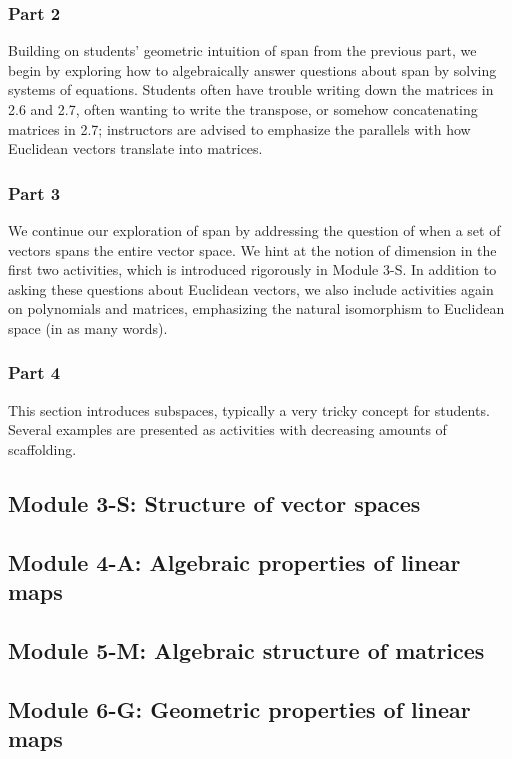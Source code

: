 \documentclass{article}
\begin{document}
\subsubsection*{Part 2}
Building on students' geometric intuition of span from the previous part, we begin by exploring how to algebraically answer questions about span by solving systems of equations.  Students often have trouble writing down the matrices in 2.6 and 2.7, often wanting to write the transpose, or somehow concatenating matrices in 2.7; instructors are advised to emphasize the parallels with how Euclidean vectors translate into matrices.

\subsubsection*{Part 3}
We continue our exploration of span by addressing the question of when a set of vectors spans the entire vector space.  We hint at the notion of dimension in the first two activities, which is introduced rigorously in Module 3-S.  In addition to asking these questions about Euclidean vectors, we also include activities again on polynomials and matrices, emphasizing the natural isomorphism to Euclidean space (in as many words).  

\subsubsection*{Part 4}
This section introduces subspaces, typically a very tricky concept for students.  Several examples are presented as activities with decreasing amounts of scaffolding.

\subsection*{Module 3-S: Structure of vector spaces}
\subsection*{Module 4-A: Algebraic properties of linear maps}
\subsection*{Module 5-M: Algebraic structure of matrices}

\subsection*{Module 6-G: Geometric properties of linear maps}
\end{document}
